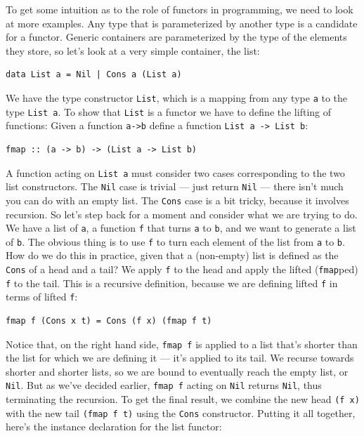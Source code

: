 To get some intuition as to the role of functors in programming, we need
to look at more examples. Any type that is parameterized by another type
is a candidate for a functor. Generic containers are parameterized by
the type of the elements they store, so let's look at a very simple
container, the list:

\begin{verbatim}
data List a = Nil | Cons a (List a)
\end{verbatim}

We have the type constructor \texttt{List}, which is a mapping from any
type \texttt{a} to the type \texttt{List\ a}. To show that \texttt{List}
is a functor we have to define the lifting of functions: Given a
function \texttt{a-\textgreater{}b} define a function
\texttt{List\ a\ -\textgreater{}\ List\ b}:

\begin{verbatim}
fmap :: (a -> b) -> (List a -> List b)
\end{verbatim}

A function acting on \texttt{List\ a} must consider two cases
corresponding to the two list constructors. The \texttt{Nil} case is
trivial --- just return \texttt{Nil} --- there isn't much you can do
with an empty list. The \texttt{Cons} case is a bit tricky, because it
involves recursion. So let's step back for a moment and consider what we
are trying to do. We have a list of \texttt{a}, a function \texttt{f}
that turns \texttt{a} to \texttt{b}, and we want to generate a list of
\texttt{b}. The obvious thing is to use \texttt{f} to turn each element
of the list from \texttt{a} to \texttt{b}. How do we do this in
practice, given that a (non-empty) list is defined as the \texttt{Cons}
of a head and a tail? We apply \texttt{f} to the head and apply the
lifted (\texttt{fmap}ped) \texttt{f} to the tail. This is a recursive
definition, because we are defining lifted \texttt{f} in terms of lifted
\texttt{f}:

\begin{verbatim}
fmap f (Cons x t) = Cons (f x) (fmap f t)
\end{verbatim}

Notice that, on the right hand side, \texttt{fmap\ f} is applied to a
list that's shorter than the list for which we are defining it --- it's
applied to its tail. We recurse towards shorter and shorter lists, so we
are bound to eventually reach the empty list, or \texttt{Nil}. But as
we've decided earlier, \texttt{fmap\ f} acting on \texttt{Nil} returns
\texttt{Nil}, thus terminating the recursion. To get the final result,
we combine the new head \texttt{(f\ x)} with the new tail
\texttt{(fmap\ f\ t)} using the \texttt{Cons} constructor. Putting it
all together, here's the instance declaration for the list functor:

